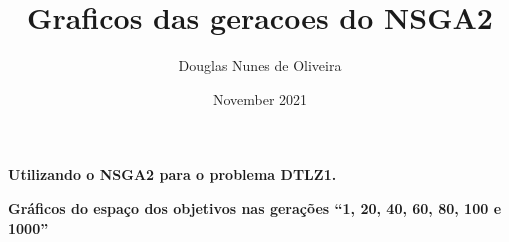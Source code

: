 \documentclass[11pt, a4paper]{report}
\title{Graficos das geracoes do NSGA2}
\author{Douglas Nunes de Oliveira}
\date{November 2021}
\begin{document}
    \begin{center}
        \textbf{Utilizando o NSGA2 para o problema DTLZ1.}
        
        \textbf{Gráficos do espaço dos objetivos nas gerações ``1, 20, 40, 60, 80, 100 e 1000''}
        
        
    \end{center}
    

    
    \hrulefill
    

    \newpage

    
    \hrulefill
    
    
    \newpage
    
    \hrulefill
    
    
    \newpage
    
    \hrulefill
\end{document}
